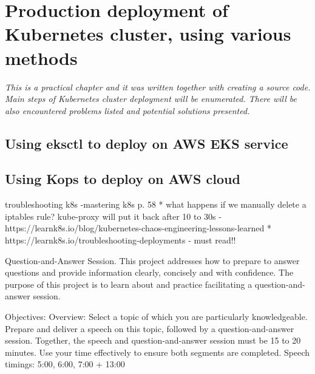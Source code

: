 \section{Production deployment of Kubernetes cluster, using various methods}
\textit{This is a practical chapter and it was written together with creating a source code. Main steps of Kubernetes cluster deployment will be enumerated. There will be also encountered problems listed and potential solutions presented.}

\subsection{Using eksctl to deploy on AWS EKS service}
\subsection{Using Kops to deploy on AWS cloud}

troubleshooting k8s -mastering k8s p. 58
* what happens if we manually delete a iptables rule? kube-proxy will put it back after 10 to 30s - https://learnk8s.io/blog/kubernetes-chaos-engineering-lessons-learned
* https://learnk8s.io/troubleshooting-deployments - must read!!



Question-and-Answer Session.
This project addresses how to prepare to answer questions and provide information clearly, concisely and with confidence.
The purpose of this project is to learn about and practice facilitating a question-and-answer session.

Objectives:
Overview: Select a topic of which you are particularly knowledgeable. Prepare and deliver a speech on this topic, followed by a question-and-answer session. Together, the speech and question-and-answer session must be 15 to 20 minutes. Use your time effectively to ensure both segments are completed.
Speech timings: 5:00, 6:00, 7:00 + 13:00
